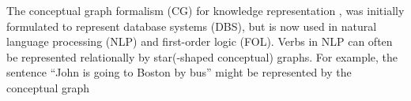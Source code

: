 \documentclass{amsart}
\def\to{\rightarrow}
\theoremstyle{remark}
\theoremstyle{definition}
\begin{document}
The conceptual graph formalism (CG)
%
%
for knowledge representation \cite{S:KR},
was initially formulated to represent database systems (DBS),
but is now used in natural language processing (NLP) and first-order logic (FOL).
%
%
Verbs in NLP can often be represented relationally by star(-shaped conceptual) graphs.
For example,
the sentence ``John is going to Boston by bus'' might be represented by the conceptual graph
\end{document}
